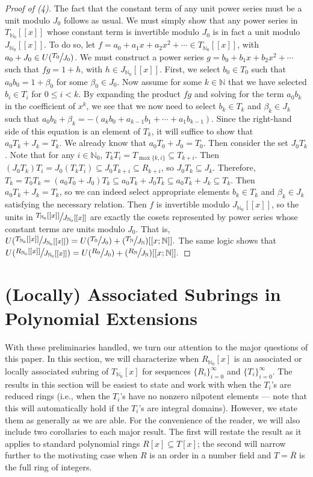 \documentclass[12pt]{amsart}
\theoremstyle{definition}
\newcommand{\bN}{\mathbb N}
\newcommand{\bNo}{{{\mathbb N}_0}}
\newcommand{\Rbar}{{\overline{R}}}
\newcommand{\quot}[2]{\large\sfrac{#1}{#2}\normalsize}
\begin{document}
\begin{proof}[Proof of (4)]
    The fact that the constant term of any unit power series must be a unit modulo $J_0$ follows as usual. We must simply show that any power series in $T_{\bNo}[[x]]$ whose constant term is invertible modulo $J_0$ is in fact a unit modulo $J_{\bNo}[[x]]$. To do so, let $f=a_0+a_1x+a_2x^2+\cdots\in T_\bNo[[x]]$, with $a_0+J_0\in U(\quot{T_0}{J_0})$. We must construct a power series $g=b_0+b_1x+b_2x^2+\cdots$ such that $fg=1+h$, with $h\in J_{\bNo}[[x]]$. First, we select $b_0\in T_0$ such that $a_0b_0=1+\beta_0$ for some $\beta_0\in J_0$. Now assume for some $k\in\bN$ that we have selected $b_i\in T_i$ for $0\leq i<k$. By expanding the product $fg$ and solving for the term $a_0b_k$ in the coefficient of $x^k$, we see that we now need to select $b_k\in T_k$ and $\beta_k\in J_k$ such that $a_0b_k+\beta_k=-(a_kb_0+a_{k-1}{b_1}+\cdots+a_1b_{k-1})$. Since the right-hand side of this equation is an element of $T_k$, it will suffice to show that $a_0T_k+J_k=T_k$. We already know that $a_0T_0+J_0=T_0$. Then consider the set $J_0T_k$. Note that for any $i\in\bN_0$, $T_kT_i= T_{\max\{k,i\}}\subseteq T_{k+i}$. Then $(J_0T_k)T_i = J_0(T_kT_i)\subseteq J_0T_{k+i}\subseteq R_{k+i}$, so $J_0T_k\subseteq J_k$. Therefore, $T_k=T_0T_k=(a_0T_0+J_0)T_k\subseteq a_0T_k+J_0T_k\subseteq a_0T_k+J_k\subseteq T_k$. Then $a_0T_k+J_k=T_k$, so we can indeed select appropriate elements $b_k\in T_k$ and $\beta_k\in J_k$ satisfying the necessary relation. Then $f$ is invertible modulo $J_\bNo[[x]]$, so the units in $\quot{T_{\bNo}[[x]]}{J_{\bNo}[[x]]}$ are exactly the cosets represented by power series whose constant terms are units modulo $J_0$. That is, $U(\quot{T_{\bNo}[[x]]}{J_{\bNo}[[x]]})=U(\quot{T_0}{J_0})+(\quot{T_{\bN}}{J_{\bN}})[[x;\bN]].$ The same logic shows that $U(\quot{R_{\bNo}[[x]]}{J_{\bNo}[[x]]})=U(\quot{R_0}{J_0})+(\quot{R_{\bN}}{J_{\bN}})[[x;\bN]].$
\end{proof}

\section{(Locally) Associated Subrings in Polynomial Extensions}

With these preliminaries handled, we turn our attention to the major questions of this paper. In this section, we will characterize when $R_\bNo[x]$ is an associated or locally associated subring of $T_\bNo[x]$ for sequences $\{R_i\}_{i=0}^\infty$ and $\{T_i\}_{i=0}^\infty$. The results in this section will be easiest to state and work with when the $T_i$'s are reduced rings (i.e., when the $T_i$'s have no nonzero nilpotent elements --- note that this will automatically hold if the $T_i$'s are integral domains). However, we state them as generally as we are able. For the convenience of the reader, we will also include two corollaries to each major result. The first will restate the result as it applies to standard polynomial rings $R[x]\subseteq T[x]$; the second will narrow further to the motivating case when $R$ is an order in a number field and $T=\Rbar$ is the full ring of integers.
\end{document}
